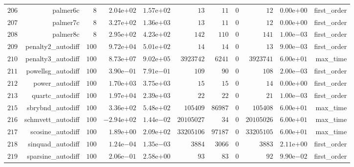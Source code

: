 \documentclass[varwidth=20cm,crop=true]{standalone}
\begin{document}
\begin{longtable}{rrrrrrrrrrr}
  \(   206\) & palmer6c & \(     8\) & \( 2.04\)e\(+02\) & \( 1.57\)e\(+02\) & \(    13\) & \(    11\) & \(     0\) & \(    12\) & \( 0.00\)e\(+00\) & first\_order \\
  \(   207\) & palmer7c & \(     8\) & \( 3.27\)e\(+02\) & \( 1.36\)e\(+03\) & \(    13\) & \(    11\) & \(     0\) & \(    12\) & \( 0.00\)e\(+00\) & first\_order \\
  \(   208\) & palmer8c & \(     8\) & \( 2.95\)e\(+02\) & \( 4.23\)e\(+02\) & \(   142\) & \(   110\) & \(     0\) & \(   141\) & \( 1.00\)e\(-03\) & first\_order \\
  \(   209\) & penalty2\_autodiff & \(   100\) & \( 9.72\)e\(+04\) & \( 5.01\)e\(+02\) & \(    14\) & \(    14\) & \(     0\) & \(    13\) & \( 9.00\)e\(-03\) & first\_order \\
  \(   210\) & penalty3\_autodiff & \(   100\) & \( 8.73\)e\(+07\) & \( 9.02\)e\(+05\) & \(3923742\) & \(  6241\) & \(     0\) & \(3923741\) & \( 6.00\)e\(+01\) & max\_time \\
  \(   211\) & powellsg\_autodiff & \(   100\) & \( 3.90\)e\(-01\) & \( 7.91\)e\(-01\) & \(   109\) & \(    90\) & \(     0\) & \(   108\) & \( 2.00\)e\(-03\) & first\_order \\
  \(   212\) & power\_autodiff & \(   100\) & \( 1.70\)e\(+03\) & \( 3.75\)e\(+03\) & \(    15\) & \(    15\) & \(     0\) & \(    14\) & \( 0.00\)e\(+00\) & first\_order \\
  \(   213\) & quartc\_autodiff & \(   100\) & \( 1.97\)e\(+04\) & \( 2.39\)e\(+03\) & \(    22\) & \(    22\) & \(     0\) & \(    21\) & \( 1.00\)e\(-03\) & first\_order \\
  \(   215\) & sbrybnd\_autodiff & \(   100\) & \( 3.36\)e\(+02\) & \( 5.48\)e\(+02\) & \(105409\) & \( 86987\) & \(     0\) & \(105408\) & \( 6.00\)e\(+01\) & max\_time \\
  \(   216\) & schmvett\_autodiff & \(   100\) & \(-2.94\)e\(+02\) & \( 1.44\)e\(-02\) & \(20105027\) & \(    34\) & \(     0\) & \(20105026\) & \( 6.00\)e\(+01\) & max\_time \\
  \(   217\) & scosine\_autodiff & \(   100\) & \( 1.89\)e\(+00\) & \( 2.09\)e\(+02\) & \(33205106\) & \( 97187\) & \(     0\) & \(33205105\) & \( 6.00\)e\(+01\) & max\_time \\
  \(   218\) & sinquad\_autodiff & \(   100\) & \( 1.24\)e\(-04\) & \( 1.35\)e\(-03\) & \(  3884\) & \(  3066\) & \(     0\) & \(  3883\) & \( 2.11\)e\(+00\) & first\_order \\
  \(   219\) & sparsine\_autodiff & \(   100\) & \( 2.06\)e\(-01\) & \( 2.58\)e\(+00\) & \(    93\) & \(    83\) & \(     0\) & \(    92\) & \( 9.90\)e\(-02\) & first\_order \\

\end{longtable}
\end{document}
